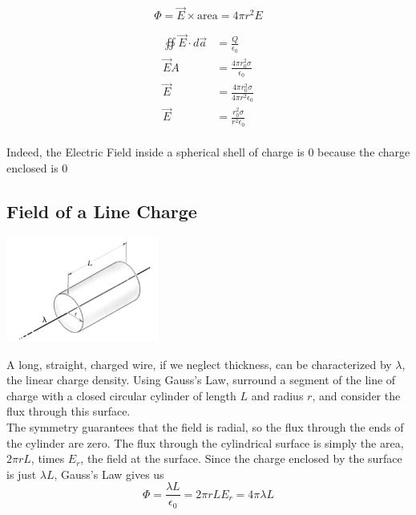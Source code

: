 \documentclass[svgnames]{article}
\begin{document}
\[ \Phi = \vec{E} \times \text{area} = 4\pi r^2 E \] 

\begin{align*} 
\oiint \vec{E} \cdot d\vec{a} &= \frac{Q}{\epsilon_0} \\
\vec{E}A &= \frac{4\pi r_0^2 \sigma}{\epsilon_0} \\ 
\vec{E} &= \frac{4\pi r_0^2 \sigma}{4\pi r^2 \epsilon_0} \\ 
\vec{E} &= \frac{r_0^2 \sigma}{r^2 \epsilon_0}
\end{align*} \\


Indeed, the Electric Field inside a spherical shell of charge is 0 because the charge enclosed is 0 \\

\subsection{Field of a Line Charge} 

\vspace{20px} 

\begin{center}
\includegraphics[width = 50mm]{screenshot.png}
\end{center} 


\vspace{10px}


A long, straight, charged wire, if we neglect thickness, can be characterized by $\lambda$, the linear charge density. Using Gauss's Law, surround a segment of the line of charge with a closed circular cylinder of length $L$ and radius $r$, and consider the flux through this surface. \\

The symmetry guarantees that the field is radial, so the flux through the ends of the cylinder are zero. The flux through the cylindrical surface is simply the area, $2\pi rL$, times $E_r$, the field at the surface. Since the charge enclosed by the surface is just $\lambda L$, Gauss's Law gives us \\

\[ \Phi = \frac{\lambda L}{\epsilon_0} = 2\pi r L E_r = 4 \pi \lambda L  \]  
\end{document}
